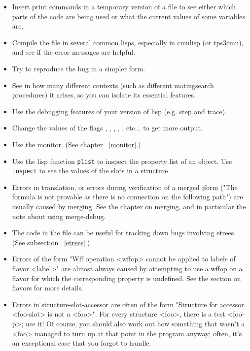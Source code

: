 \begin{itemize}
\item Insert print commands in a temporary version of a file to see either 
which parts of the code are being used or what the current values of some
variables are.

\item Compile the file in several common lisps, especially in
cmulisp (or tps3cmu), and see if the error messages are helpful.

\item Try to reproduce the bug in a simpler form.

\item See in how many different contexts (such as different
matingsearch procedures) it arises, so you can isolate its essential
features.

\item Use the debugging features of your version of lisp (e.g. step and trace).

\item Change the values of the flags , ,
, , 
, etc... to get more output.

\item Use the monitor. (See chapter ~\ref{monitor}.)

\item Use the lisp function {\tt plist} to inspect the property list of an object.
Use {\tt inspect} to see the values of the slots in a structure.

\item Errors in translation, or errors during verification of a merged jform ("The formula is not provable 
as there is no connection on the following path") are usually caused by merging. See the chapter on
merging, and in particular the note about using merge-debug.

\item The code in the file  can be useful for tracking
down bugs involving etrees.  (See subsection ~\ref{etrees}.)

\item Errors of the form "Wff operation <wffop> cannot be applied to labels of flavor <label>" are almost always
caused by attempting to use a wffop on a flavor for which the corresponding property is undefined. See the section
on flavors for more details.

\item Errors in structure-slot-accessor are often of the form "Structure for accessor <foo-slot> is not a <foo>".
For every structure <foo>, there is a test <foo-p>; use it! Of course, you should also work out how 
something that wasn't a <foo> managed to turn up at that point in the program anyway; often, it's an exceptional
case that you forgot to handle.


\end{itemize}
